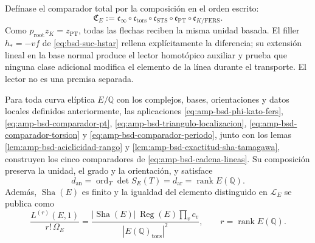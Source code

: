 Defínase el comparador total por la composición en el orden escrito:
\begin{equation}\label{eq:amp-bsd-comparador-total}
 \mathfrak C_E:=
 \mathfrak c_\infty\circ
 \mathfrak c_{\mathrm{tors}}\circ
 \mathfrak c_{\mathrm{STS}}\circ
 \mathfrak c_{\mathrm{PT}}\circ
 \mathfrak c_{K/\mathrm{FERS}}.
\end{equation}
Como \(p_{\mathrm{root}}z_K=z_{\mathrm{PT}}\), todas las flechas reciben la
misma unidad basada. El filler \(h_*=-vf\) de
\eqref{eq:bsd-suc-hstar} rellena explícitamente la diferencia; su extensión
lineal en la base normal produce el lector homotópico auxiliar y prueba que
ninguna clase adicional modifica el elemento de la línea durante el
transporte. El lector no es una premisa separada.

\begin{theorem}
\label{thm:amp-bsd-comparadores-construidos}
Para toda curva elíptica \(E/\mathbb Q\) con los complejos, bases,
orientaciones y datos locales definidos anteriormente, las aplicaciones
\eqref{eq:amp-bsd-phi-kato-fers},
\eqref{eq:amp-bsd-comparador-pt},
\eqref{eq:amp-bsd-triangulo-localizacion},
\eqref{eq:amp-bsd-comparador-torsion} y
\eqref{eq:amp-bsd-comparador-periodo}, junto con los lemas
\ref{lem:amp-bsd-aciclicidad-rango} y
\ref{lem:amp-bsd-exactitud-sha-tamagawa}, construyen los cinco comparadores de
\eqref{eq:amp-bsd-cadena-lineas}. Su composición preserva la unidad, el grado
y la orientación, y satisface
\begin{equation}\label{eq:amp-bsd-igualdad-grados}
 d_{\mathrm{an}}=\operatorname{ord}_T\det S_E(T)
 =d_{\mathrm{ar}}=\operatorname{rank}E(\mathbb Q).
\end{equation}
Además, \(\operatorname{Sha}(E)\) es finito y la igualdad del elemento
distinguido en \(\mathcal L_E\) se publica como
\begin{equation}\label{eq:amp-bsd-termino-principal}
 \frac{L^{(r)}(E,1)}{r!\,\Omega_E}
 =\frac{|\operatorname{Sha}(E)|\,\operatorname{Reg}(E)
        \prod_v c_v}
       {|E(\mathbb Q)_{\mathrm{tors}}|^2},
 \qquad r=\operatorname{rank}E(\mathbb Q).
\end{equation}
\end{theorem}

